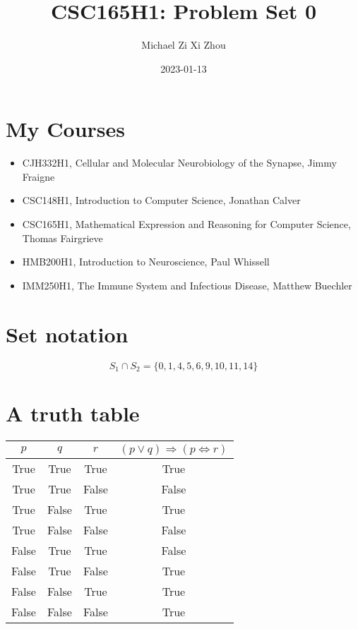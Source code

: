 \documentclass[12pt]{article}
\title{CSC165H1: Problem Set 0}
\author{Michael Zi Xi Zhou}
\date{2023-01-13}
\begin{document}
\maketitle

\section*{My Courses}


\begin{itemize}
    \item CJH332H1, Cellular and Molecular Neurobiology of the Synapse, Jimmy Fraigne
    \item CSC148H1, Introduction to Computer Science, Jonathan Calver 
    \item CSC165H1, Mathematical Expression and Reasoning for Computer Science, Thomas Fairgrieve
    \item HMB200H1, Introduction to Neuroscience, Paul Whissell 
    \item IMM250H1, The Immune System and Infectious Disease, Matthew Buechler
\end{itemize}

\section*{Set notation}


\[
S_1 \cap S_2 = \{0, 1, 4, 5, 6, 9, 10, 11, 14\}
\]


\section*{A truth table}
\begin{center}
\begin{tabular}{| c c c c|}
\hline
    $p$ & $q$ & $r$ & $(p \lor q) \Rightarrow (p \Leftrightarrow r)$ \\
    \hline
    True & True & True & True \\
    True & True & False & False \\
    True & False & True & True \\
    True & False & False & False \\
    False & True & True & False \\
    False & True & False & True \\
    False & False & True & True \\
    False & False & False & True \\
    \hline
\end{tabular}
\end{center}
\end{document}
